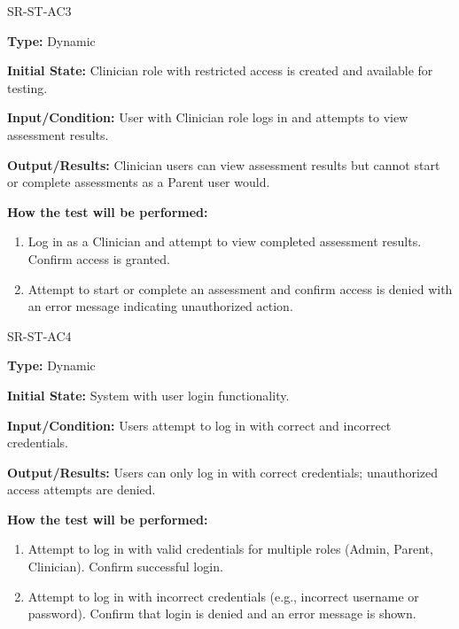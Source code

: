 \documentclass[12pt, titlepage]{article}
\begin{document}
\begin{itemize}
\begin{item}
    \begin{item}
    SR-ST-AC3
      \begin{mdframed}[linewidth=0.5mm]
        \textbf{Type:} Dynamic \par
        \textbf{Initial State:} Clinician role with restricted access is created and available for testing. \par
        \textbf{Input/Condition:} User with Clinician role logs in and attempts to view assessment results. \par
        \textbf{Output/Results:} Clinician users can view assessment results but cannot start or complete assessments as a Parent user would. \par
        \textbf{How the test will be performed:}
        \begin{enumerate}[noitemsep]
          \item Log in as a Clinician and attempt to view completed assessment results. Confirm access is granted.
          \item Attempt to start or complete an assessment and confirm access is denied with an error message indicating unauthorized action.
        \end{enumerate}
      \end{mdframed}
    \end{item}

    \begin{item}
    \end{item} SR-ST-AC4
    \begin{mdframed}[linewidth=0.5mm]
      \textbf{Type:} Dynamic \par
      \textbf{Initial State:} System with user login functionality. \par
      \textbf{Input/Condition:} Users attempt to log in with correct and incorrect credentials. \par
      \textbf{Output/Results:} Users can only log in with correct credentials; unauthorized access attempts are denied. \par
      \textbf{How the test will be performed:}
      \begin{enumerate}[noitemsep]
        \item Attempt to log in with valid credentials for multiple roles (Admin, Parent, Clinician). Confirm successful login.
        \item Attempt to log in with incorrect credentials (e.g., incorrect username or password). Confirm that login is denied and an error message is shown.
      \end{enumerate}
    \end{mdframed}
  \end{item}


\end{itemize}
\end{document}
